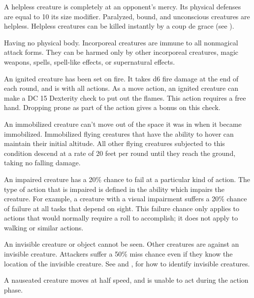  A helpless creature is completely at an opponent's mercy. Its physical defenses are equal to 10 \add its size modifier. Paralyzed, bound, and unconscious creatures are helpless. Helpless creatures can be killed instantly by a coup de grace (see ).

 Having no physical body. Incorporeal creatures are immune to all nonmagical attack forms. They can be harmed only by other incorporeal creatures, magic weapons, spells, spell-like effects, or supernatural effects.

 An ignited creature has been set on fire. It takes d6 fire damage at the end of each round, and is \impaired with all actions. As a move action, an ignited creature can make a DC 15 Dexterity check to put out the flames. This action requires a free hand. Dropping prone as part of the action gives a  bonus on this check.

 An immobilized creature can't move out of the space it was in when it became immobilized. Immobilized flying creatures that have the ability to hover can maintain their initial altitude. All other flying creatures subjected to this condition descend at a rate of 20 feet per round until they reach the ground, taking no falling damage.

 An impaired creature has a 20\% chance to fail at a particular kind of action. The type of action that is impaired is defined in the ability which impairs the creature. For example, a creature with a visual impairment suffers a 20\% chance of failure at all tasks that depend on sight. This failure chance only applies to actions that would normally require a roll to accomplish; it does not apply to walking or similar actions.

 An invisible creature or object cannot be seen. Other creatures are  against an invisible creature. Attackers suffer a 50\% miss chance even if they know the location of the invisible creature. See  and , for how to identify invisible creatures.


 A nauseated creature moves at half speed, and is unable to act during the action phase.

